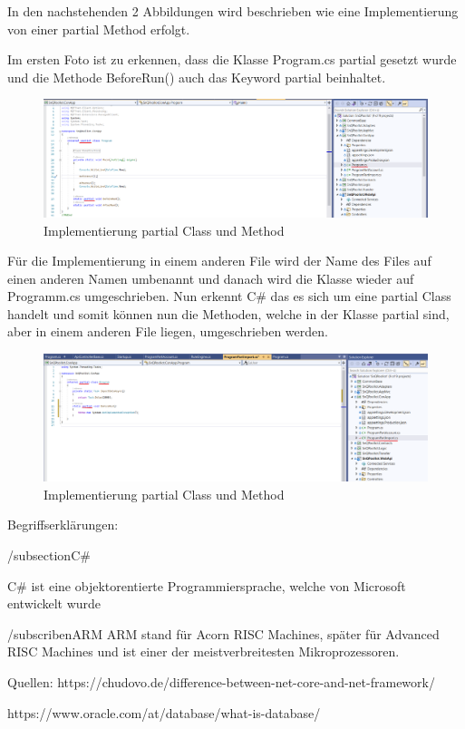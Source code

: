 In den nachstehenden 2 Abbildungen wird beschrieben wie eine Implementierung von einer partial Method erfolgt.

Im ersten Foto ist zu erkennen, dass die Klasse Program.cs partial gesetzt wurde und die Methode BeforeRun() auch das Keyword partial beinhaltet.
\begin{figure}[H]
    \centering
    \includegraphics[width=1\textwidth]{./pics/PartialKeyword1.png}
    \caption{Implementierung partial Class und Method}
\end{figure}

Für die Implementierung in einem anderen File wird der Name des Files auf einen anderen Namen umbenannt und danach wird die Klasse wieder auf Programm.cs umgeschrieben.
Nun erkennt C\# das es sich um eine partial Class handelt und somit können nun die Methoden, welche in der Klasse partial sind, aber in einem anderen File liegen, umgeschrieben werden. 
\begin{figure}[H]
    \centering
    \includegraphics[width=1\textwidth]{./pics/PartialKeyword2.png}
    \caption{Implementierung partial Class und Method}
\end{figure}


Begriffserklärungen:

/subsection{C\#}

C\# ist eine objektorentierte Programmiersprache, welche von Microsoft entwickelt
wurde

/subscriben{ARM}
ARM stand für Acorn RISC Machines, später für Advanced RISC Machines 
und ist einer der meistverbreitesten Mikroprozessoren.



Quellen:
https://chudovo.de/difference-between-net-core-and-net-framework/

https://www.oracle.com/at/database/what-is-database/


